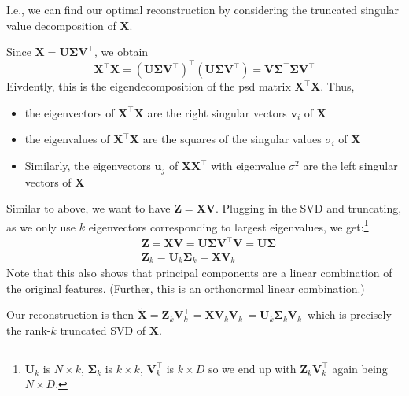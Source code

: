 \documentclass[11pt, %
	oneside, %
	english, %
	onehalfspacing, %
	parskip, %
	]{article} %
\theoremstyle{definition}
\begin{document}
I.e., we can find our optimal reconstruction by considering the truncated singular value decomposition of $\mathbf{X}$.

Since $\mathbf{X}=\mathbf{U} \boldsymbol{\Sigma} \mathbf{V}^{\boldsymbol{\top}}$, we obtain
\begin{equation*}
	\mathbf{X}^{\top} \mathbf{X}=\left(\mathbf{U} \boldsymbol{\Sigma} \mathbf{V}^{\top}\right)^{\boldsymbol{\top}}\left(\mathbf{U} \boldsymbol{\Sigma} \mathbf{V}^{\top}\right)= \mathbf{V}  \boldsymbol{\Sigma}^{\boldsymbol{\top}} \boldsymbol{\Sigma}  \mathbf{V}^{\boldsymbol{\top}}
\end{equation*}
Eivdently, this is the eigendecomposition of the psd matrix $\mathbf{X}^\top \mathbf{X}$. Thus,
\begin{itemize}
	\item the eigenvectors of $\mathbf{X}^{\top} \mathbf{X}$ are the right singular vectors $\mathbf{v}_i$ of $\mathbf{X}$
	\item the eigenvalues of $\mathbf{X}^{\top} \mathbf{X}$ are the squares of the singular values $\sigma_i$ of $\mathbf{X}$
	\item Similarly, the eigenvectors $\mathbf{u}_j$ of $\mathbf{X X}^{\top}$ with eigenvalue $\sigma^2$ are the left singular vectors of $\mathbf{X}$
\end{itemize}

Similar to above, we want to have $\mathbf{Z} = \mathbf{X V}$. Plugging in the SVD and truncating, as we only use $k$ eigenvectors corresponding to largest eigenvalues,  we get:\footnote{$\mathbf{U}_k$ is $N \times k$, $\mathbf{\Sigma}_k$ is $k \times k$, $\mathbf{V}_k^\top$ is $k \times D$ so we end up with $\mathbf{Z}_k \mathbf{V}_k^\top$ again being $N \times D$.}
\begin{equation*}
	\begin{aligned}
		&\mathbf{Z}=\mathbf{X V}=\mathbf{U} \mathbf{\Sigma} \mathbf{V}^{\top} \mathbf{V}=\mathbf{U} \mathbf{\Sigma} \\
		&\mathbf{Z}_k=\mathbf{U}_k \boldsymbol{\Sigma}_k=\mathbf{X} \mathbf{V}_k
	\end{aligned}
\end{equation*}
Note that this also shows that principal components are a linear combination of the original features. (Further, this is an orthonormal linear combination.)

Our reconstruction is then $\tilde{\mathbf{X}} = \mathbf{Z}_k \mathbf{V}_k^\top = \mathbf{X} \mathbf{V}_k \mathbf{V}_k^\top = \mathbf{U}_k \mathbf{\Sigma}_k \mathbf{V}_k^\top$ which is precisely the rank-$k$ truncated SVD of $\mathbf{X}$.
\end{document}
